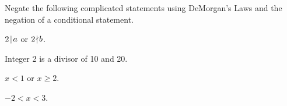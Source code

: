 \begin{question}[resume]
	\item Negate the following complicated statements using DeMorgan's Laws and the negation of a conditional statement.
	\begin{qpart} \itemsep1in
	\item $2 \! \mid \! a$ or $2 \! \nmid \! b$.
	\item Integer 2 is a divisor of 10 and 20.
	\item $x<1$ or $x \geq 2$.
	\item $-2<x<3$.
	\vspace{1in}
	\end{qpart}
	




\end{question}
